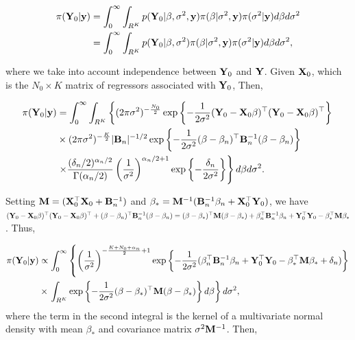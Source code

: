\begin{align*}
	\pi({\bf{Y}}_0|{\bf{y}})&=\int_{0}^{\infty}\int_{R^K}p({\bf{Y}}_0|\beta,\sigma^2,{\bf{y}})\pi(\beta|\sigma^2,{\bf{y}})\pi(\sigma^2|{\bf{y}})d\beta d\sigma^2\\
	&=\int_{0}^{\infty}\int_{R^K}p({\bf{Y}}_0|\beta,\sigma^2)\pi(\beta|\sigma^2,{\bf{y}})\pi(\sigma^2|{\bf{y}})d\beta d\sigma^2,
\end{align*}

where we take into account independence between ${\bf{Y}}_0$ and ${\bf{Y}}$. Given ${\bf{X}}_0$, which is the $N_0\times K$ matrix of regressors associated with ${\bf{Y}}_0$, Then,

\begin{align*}
	\pi({\bf{Y}}_0|{\bf{y}})&=\int_{0}^{\infty}\int_{R^K}\left\{ (2\pi\sigma^2)^{-\frac{N_0}{2}} \exp \left\{-\frac{1}{2\sigma^2} ({\bf{Y}}_0 - {\bf{X}}_0\beta)^{\top}({\bf{Y}}_0 - {\bf{X}}_0\beta)^{\top} \right\}\right. \\
	& \times (2\pi\sigma^2)^{-\frac{K}{2}} |{\bf{B}}_n|^{-1/2} \exp \left\{-\frac{1}{2\sigma^2} (\beta - \beta_n)^{\top}{\bf{B}}_n^{-1}(\beta - \beta_n)\right\} \\
	& \left. \times \frac{(\delta_n/2)^{\alpha_n/2}}{\Gamma(\alpha_n/2)}\left(\frac{1}{\sigma^2}\right)^{\alpha_n/2+1}\exp \left\{-\frac{\delta_n}{2\sigma^2} \right\}\right\}d\beta d\sigma^2. \\
\end{align*}

Setting ${\bf{M}}=({\bf{X}}_0^{\top}{\bf{X}}_0+{\bf{B}}_n^{-1})$ and $\beta_*={\bf{M}}^{-1}({\bf{B}}_n^{-1}\beta_n+{\bf{X}}_0^{\top}{\bf{Y}}_0)$, we have
$({\bf{Y}}_0 - {\bf{X}}_0\beta)^{\top}({\bf{Y}}_0 - {\bf{X}}_0\beta)^{\top}+(\beta - \beta_n)^{\top}{\bf{B}}_n^{-1}(\beta - \beta_n)=(\beta - \beta_*)^{\top}{\bf{M}}(\beta - \beta_*)+\beta_n^{\top}{\bf{B}}_n^{-1}\beta_n+{\bf{Y}}_0^{\top}{\bf{Y}}_0-\beta_*^{\top}{\bf{M}}\beta_*$.
Thus, 

{\footnotesize{
\begin{align*}
	\pi({\bf{Y}}_0|{\bf{y}})&\propto\int_{0}^{\infty}\left\{\left(\frac{1}{\sigma^2}\right)^{-\frac{K+N_0+\alpha_n}{2}+1}\exp\left\{-\frac{1}{2\sigma^2}(\beta_n^{\top}{\bf{B}}_n^{-1}\beta_n+{\bf{Y}}_0^{\top}{\bf{Y}}_0-\beta_*^{\top}{\bf{M}}\beta_*+\delta_n)\right\}\right.\\
	&\times\left.\int_{R^K}\exp\left\{-\frac{1}{2\sigma^2}(\beta - \beta_*)^{\top}{\bf{M}}(\beta - \beta_*)\right\}d\beta\right\} d\sigma^2,\\
\end{align*}
}}
where the term in the second integral is the kernel of a multivariate normal density with mean $\beta_*$ and covariance matrix $\sigma^2{\bf{M}}^{-1}$. Then,

